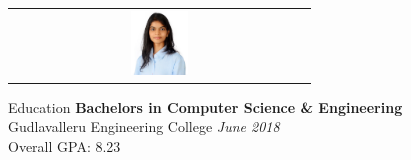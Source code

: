 \documentclass{resume}
\begin{document}
\begin{flushleft}

\hspace*{\fill}%
\begin{tabular}{@{}c@{}}
  \includegraphics[width=0.20\textwidth]{pic1.jpeg}
\end{tabular}

\end{flushleft}

\pagecolor{white}

  \begin{rSection}{Education}
    {\bf Bachelors in Computer Science \& Engineering } \\
    {Gudlavalleru Engineering College} \hfill {\em June 2018} \\ 
    Overall GPA: 8.23
  \end{rSection}
  
\end{document}

